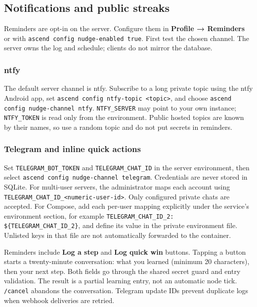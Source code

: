 \hypertarget{notifications-and-public-streaks}{%
\subsection{Notifications and public
streaks}\label{notifications-and-public-streaks}}

Reminders are opt-in on the server. Configure them in \textbf{Profile →
Reminders} or with \texttt{ascend config nudge-enabled true}. First
test the chosen channel. The server owns the log and schedule; clients
do not mirror the database.

\hypertarget{ntfy}{%
\subsubsection{ntfy}\label{ntfy}}

The default server channel is ntfy. Subscribe to a long private topic
using the ntfy Android app, set
\texttt{ascend config ntfy-topic \textless{}topic\textgreater{}}, and
choose \texttt{ascend config nudge-channel ntfy}.
\texttt{NTFY\_SERVER} may point to your own instance;
\texttt{NTFY\_TOKEN} is read only from the environment. Public hosted
topics are known by their names, so use a random topic and do not put
secrets in reminders.

\hypertarget{telegram-and-inline-quick-actions}{%
\subsubsection{Telegram and inline quick
actions}\label{telegram-and-inline-quick-actions}}

Set \texttt{TELEGRAM\_BOT\_TOKEN} and \texttt{TELEGRAM\_CHAT\_ID} in the
server environment, then select
\texttt{ascend config nudge-channel telegram}. Credentials are never
stored in SQLite. For multi-user servers, the administrator maps each
account using
\texttt{TELEGRAM\_CHAT\_ID\_\textless{}numeric-user-id\textgreater{}}.
Only configured private chats are accepted.
For Compose, add each per-user mapping explicitly under the service's environment
section, for example \texttt{TELEGRAM\_CHAT\_ID\_2: \$\{TELEGRAM\_CHAT\_ID\_2\}},
and define its value in the private environment file. Unlisted keys in that file
are not automatically forwarded to the container.

Reminders include \textbf{Log a step} and \textbf{Log quick win}
buttons. Tapping a button starts a twenty-minute conversation: what you
learned (minimum 20 characters), then your next step. Both fields go
through the shared secret guard and entry validation. The result is a
partial learning entry, not an automatic node tick. \texttt{/cancel}
abandons the conversation. Telegram update IDs prevent duplicate logs
when webhook deliveries are retried.

